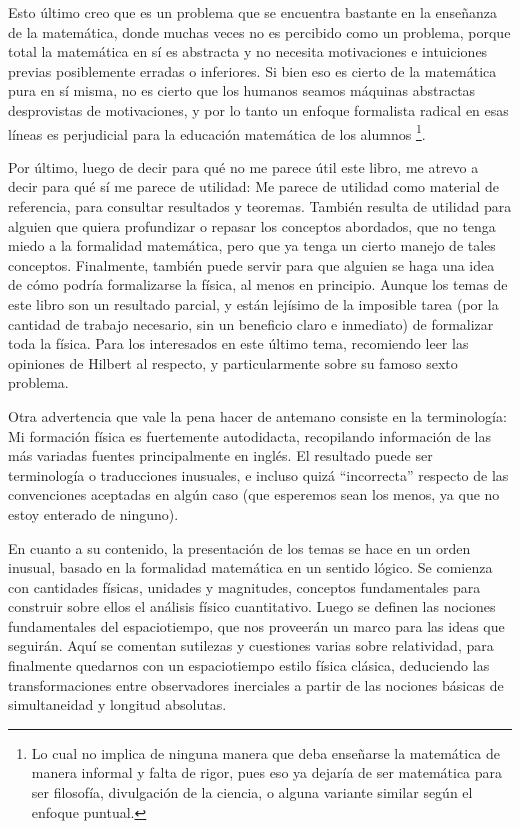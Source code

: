 \documentclass{article}
\begin{document}
Esto último creo que es un problema que se encuentra bastante en la enseñanza de la matemática, donde muchas veces no es percibido
como un problema, porque total la matemática en sí es abstracta y no necesita motivaciones e intuiciones previas posiblemente erradas
o inferiores. Si bien eso es cierto de la matemática pura en sí misma, no es cierto que los humanos seamos máquinas abstractas desprovistas
de motivaciones, y por lo tanto un enfoque formalista radical en esas líneas es perjudicial para la educación matemática de los alumnos
\footnote{Lo cual no implica de ninguna manera que deba enseñarse la matemática de manera informal y falta de rigor, pues eso
ya dejaría de ser matemática para ser filosofía, divulgación de la ciencia, o alguna variante similar según el enfoque puntual.}.

Por último, luego de decir para qué no me parece útil este libro, me atrevo a decir para qué sí me parece de utilidad: Me parece de
utilidad como material de referencia, para consultar resultados y teoremas. También resulta de utilidad para alguien que quiera profundizar
o repasar los conceptos abordados, que no tenga miedo a la formalidad matemática, pero que ya tenga un cierto manejo de tales conceptos.
Finalmente, también puede servir para que alguien se haga una idea de cómo podría formalizarse la física, al menos en principio. Aunque
los temas de este libro son un resultado parcial, y están lejísimo de la imposible tarea (por la cantidad de trabajo necesario,
sin un beneficio claro e inmediato) de formalizar toda la física. Para los interesados en este último tema, recomiendo leer las opiniones de
Hilbert al respecto, y particularmente sobre su famoso sexto problema.

Otra advertencia que vale la pena hacer de antemano consiste en la terminología: Mi formación física es fuertemente autodidacta,
recopilando información de las más variadas fuentes principalmente en inglés. El resultado puede ser terminología o traducciones inusuales,
e incluso quizá ``incorrecta'' respecto de las convenciones aceptadas en algún caso (que esperemos sean los menos, ya
que no estoy enterado de ninguno).

En cuanto a su contenido, la presentación de los temas se hace en un orden inusual, basado en la formalidad matemática en
un sentido lógico. Se comienza con cantidades físicas, unidades y magnitudes, conceptos fundamentales para construir sobre ellos el análisis físico cuantitativo.
Luego se definen las nociones fundamentales del espaciotiempo, que nos proveerán un marco para las ideas que seguirán. Aquí se
comentan sutilezas y cuestiones varias sobre relatividad, para finalmente quedarnos con un espaciotiempo estilo física clásica,
deduciendo las transformaciones entre observadores inerciales a partir de las nociones básicas de simultaneidad y longitud absolutas.
\end{document}
